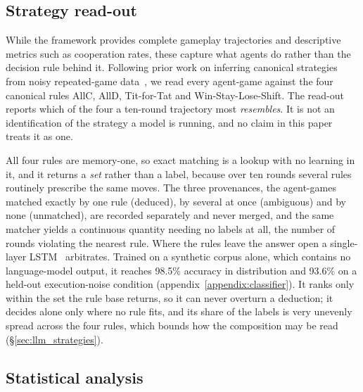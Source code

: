 \documentclass[openacc]{rsproca_new}
\begin{document}
\subsection{Strategy read-out}\label{sec:readout}

While the framework provides complete gameplay trajectories and descriptive
metrics such as cooperation rates, these capture what agents do rather than the
decision rule behind it. Following prior work on inferring canonical strategies
from noisy repeated-game data~\cite{han2011role,Han2012ALIFEjournal,diStefanoIntention2023},
we read every agent-game against the four canonical rules AllC, AllD,
Tit-for-Tat and Win-Stay-Lose-Shift. The read-out reports which of the four a
ten-round trajectory most \emph{resembles}. It is not an identification of the
strategy a model is running, and no claim in this paper treats it as one.

All four rules are memory-one, so exact matching is a lookup with no learning
in it, and it returns a \emph{set} rather than a label, because over ten rounds
several rules routinely prescribe the same moves. The three provenances, the
agent-games matched exactly by one rule (deduced), by several at once
(ambiguous) and by none (unmatched), are recorded separately and never merged,
and the same matcher yields a continuous quantity needing no labels at all, the
number of rounds violating the nearest rule. Where the rules leave the answer
open a single-layer LSTM~\cite{lstm} arbitrates. Trained on a synthetic corpus alone, which contains no language-model output, it reaches 98.5\% accuracy in distribution and 93.6\% on a held-out
execution-noise condition (appendix~\ref{appendix:classifier}). It ranks only within the set the
rule base returns, so it can never overturn a deduction; it decides alone only
where no rule fits, and its share of the labels is very unevenly spread across
the four rules, which bounds how the composition may be read
(\S\ref{sec:llm_strategies}).

\subsection{Statistical analysis}\label{sec:stats}
\end{document}
